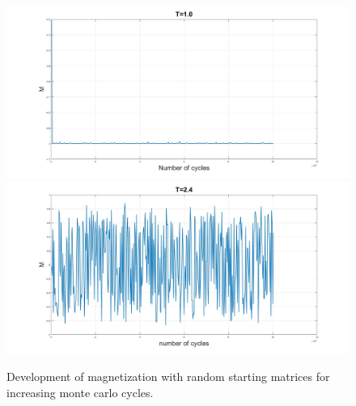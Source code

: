 \documentclass[10pt,a4paper]{article}
\begin{document}
\begin{figure} [H]
\centerline{
\includegraphics[scale=0.15]{RANDOMmag1notabs.jpg}
\includegraphics[scale=0.15]{RANDOMmag24notabs.jpg}
}
\caption{Development of magnetization with random starting matrices for increasing monte carlo cycles.}
\label{fig:RandomMagNotAbs}
\end{figure}
\end{document}
